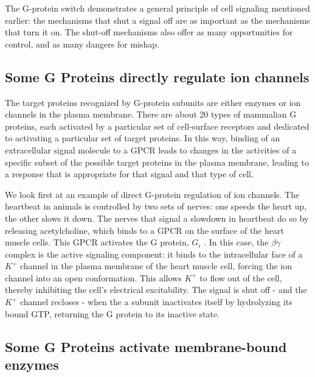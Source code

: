 The G-protein switch demonstrates a general principle of cell signaling
mentioned earlier: the mechanisms that shut a signal off are as important
as the mechanisms that turn it on. The shut-off
mechanisms also offer as many opportunities for control, and as many
dangers for mishap.

\subsection{Some G Proteins directly regulate ion channels}

The target proteins recognized by G-protein subunits are either enzymes
or ion channels in the plasma membrane. There are about 20 types of
mammalian G proteins, each activated by a particular set of cell-surface
receptors and dedicated to activating a particular set of target proteins.
In this way, binding of an extracellular signal molecule to a GPCR leads to
changes in the activities of a specific subset of the possible target proteins
in the plasma membrane, leading to a response that is appropriate for
that signal and that type of cell.

We look first at an example of direct G-protein regulation of ion channels.
The heartbeat in animals is controlled by two sets of nerves: one speeds
the heart up, the other slows it down. The nerves that signal a slowdown
in heartbeat do so by releasing acetylcholine, which binds to a GPCR on
the surface of the heart muscle cells. This GPCR activates the G protein,
$G_i$ . In this case, the $\beta\gamma$ complex is the active signaling component: it binds
to the intracellular face of a $K^+$ channel in the plasma membrane of the
heart muscle cell, forcing the ion channel into an open conformation.
This allows $K^+$ to flow out of the cell, thereby inhibiting
the cell’s electrical excitability. The signal is shut off -
and the $K^+$ channel recloses - when the a subunit inactivates itself by
hydrolyzing its bound GTP, returning the G protein to its inactive state.

\subsection{Some G Proteins activate membrane-bound enzymes}

